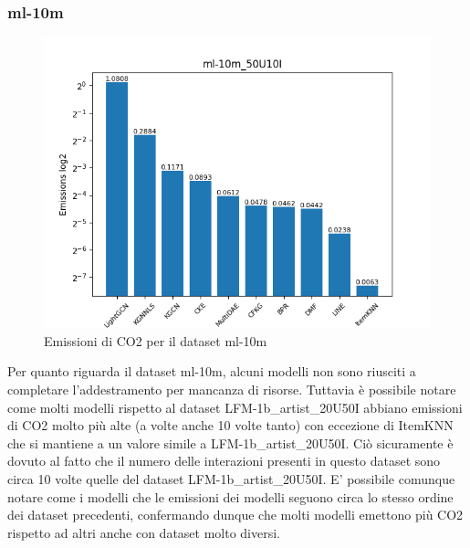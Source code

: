 \subsubsection{ml-10m}

\begin{figure}[H]
    \centering
    \includegraphics[scale=0.75]{images/emissions_ml-10m_50U10I.png}
    \caption{Emissioni di CO2 per il dataset ml-10m}
\end{figure}

Per quanto riguarda il dataset ml-10m, alcuni modelli non sono riusciti a completare l'addestramento per mancanza di risorse.
Tuttavia è possibile notare come molti modelli rispetto al dataset LFM-1b\_artist\_20U50I abbiano emissioni di CO2 molto più alte (a volte anche 10 volte tanto) con eccezione di ItemKNN che si mantiene a un valore simile a LFM-1b\_artist\_20U50I.
Ciò sicuramente è dovuto al fatto che il numero delle interazioni presenti in questo dataset sono circa 10 volte quelle del dataset LFM-1b\_artist\_20U50I.
E' possibile comunque notare come i modelli che le emissioni dei modelli seguono circa lo stesso ordine dei dataset precedenti, confermando dunque che molti modelli emettono più CO2 rispetto ad altri anche con dataset molto diversi.





